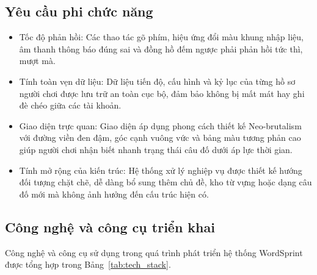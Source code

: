 \subsection{Yêu cầu phi chức năng}
\label{subsec:non_functional_requirements}
\begin{itemize}
    \item Tốc độ phản hồi: Các thao tác gõ phím, hiệu ứng đổi màu khung nhập liệu, âm thanh thông báo đúng sai và đồng hồ đếm ngược phải phản hồi tức thì, mượt mà.
    \item Tính toàn vẹn dữ liệu: Dữ liệu tiến độ, cấu hình và kỷ lục của từng hồ sơ người chơi được lưu trữ an toàn cục bộ, đảm bảo không bị mất mát hay ghi đè chéo giữa các tài khoản.
    \item Giao diện trực quan: Giao diện áp dụng phong cách thiết kế Neo-brutalism với đường viền đen đậm, góc cạnh vuông vức và bảng màu tương phản cao giúp người chơi nhận biết nhanh trạng thái câu đố dưới áp lực thời gian.
    \item Tính mở rộng của kiến trúc: Hệ thống xử lý nghiệp vụ được thiết kế hướng đối tượng chặt chẽ, dễ dàng bổ sung thêm chủ đề, kho từ vựng hoặc dạng câu đố mới mà không ảnh hưởng đến cấu trúc hiện có.
\end{itemize}

\subsection{Công nghệ và công cụ triển khai}
\label{subsec:tech_stack}
Công nghệ và công cụ sử dụng trong quá trình phát triển hệ thống WordSprint được tổng hợp trong Bảng~\ref{tab:tech_stack}.

